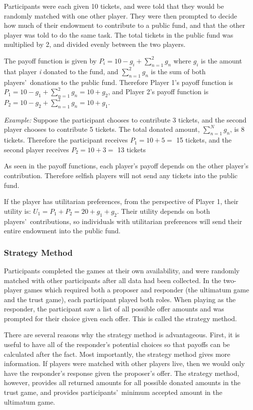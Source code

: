 \documentclass[12pt]{article}
\begin{document}
Participants were each given 10 tickets, and were told that they would be randomly matched with one other player. They were then prompted to decide how much of their endowment to contribute to a public fund, and that the other player was told to do the same task. The total tickets in the public fund was multiplied by 2, and divided evenly between the two players.

The payoff function is given by \( P_{i} = 10 - g_{i} + \sum_{n=1}^{2} g_{n}\) where \(g_{i}\) is the amount that player \textit{i} donated to the fund, and \(\sum_{n=1}^{2}g_{n}\) is the sum of both players\rq \ donations to the public fund. Therefore Player 1\rq s payoff function is \( P_{1} = 10 - g_{1} + \sum_{n=1}^{2} g_{n} = 10 + g_{2}\), and Player 2\rq s payoff function is \( P_{2} = 10 - g_{2} + \sum_{n=1}^{2} g_{n} = 10 + g_{1}\).

\textit{Example:} Suppose the participant chooses to contribute 3 tickets, and the second player chooses to contribute 5 tickets. The total donated amount, \(\sum_{n=1}^{N} g_{n}\), is 8 tickets. Therefore the participant receives \( P_{1} = 10 + 5  = \) 15 tickets, and the second player receives \( P_{2} = 10 + 3 = \) 13 tickets 

As seen in the payoff functions, each player\rq s payoff depends on the other player\rq s contribution. Therefore selfish players will not send any tickets into the public fund.

If the player has utilitarian preferences, from the perspective of Player 1, their utility is: \(U_{1} = P_{1} + P_{2} =  20 + g_{1} + g_{2}\). Their utility depends on both players\rq \ contributions, so individuals with utilitarian preferences will send their entire endowment into the public fund.


\subsubsection{Strategy Method}

Participants completed the games at their own availability, and were randomly matched with other participants after all data had been collected. In the two-player games which required both a proposer and responder (the ultimatum game and the trust game), each participant played both roles. When playing as the responder, the participant saw a list of all possible offer amounts and was prompted for their choice given each offer. This is called the strategy method.

There are several reasons why the strategy method is advantageous. First, it is useful to have all of the responder\rq s potential choices so that payoffs can be calculated after the fact. Most importantly, the strategy method gives more information. If players were matched with other players live, then we would only have the responder\rq s response given the proposer\rq s offer. The strategy method, however, provides all returned amounts for all possible donated amounts in the trust game, and provides participants\rq \ minimum accepted amount in the ultimatum game. 
\end{document}
